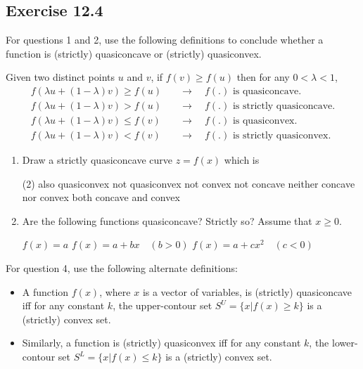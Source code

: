 \documentclass{./../../Latex/homework}
\begin{document}
\subsection*{Exercise 12.4}
For questions 1 and 2, use the following definitions to conclude whether a function is (strictly) quasiconcave or (strictly) quasiconvex. 

Given two distinct points $u$ and $v$, if $f(v) \geq f(u)$ then for any $0 <\lambda< 1 $, 
\begin{align*}
	f(\lambda u + (1-\lambda) v) \geq f(u) \quad & \rightarrow \quad f(.) \text{ is quasiconcave.} \\
	f(\lambda u + (1-\lambda) v) > f(u) \quad & \rightarrow \quad f(.) \text{ is strictly quasiconcave.} \\
	f(\lambda u + (1-\lambda) v) \leq f(v) \quad & \rightarrow \quad f(.) \text{ is quasiconvex.} \\
	f(\lambda u + (1-\lambda) v) < f(v) \quad & \rightarrow \quad f(.) \text{ is strictly quasiconvex.} 
\end{align*}

\begin{enumerate}

\item Draw a strictly quasiconcave curve $z=f(x)$ which is
\begin{tasks}(2)
\task also quasiconvex
\task not quasiconvex
\task not convex
\task not concave
\task neither concave nor convex
\task both concave and convex 	
\end{tasks}


\item Are the following functions quasiconcave? Strictly so? Assume that $x \geq 0$.
\begin{tasks}
\task $f(x)=a$
\task $f(x)=a+b x \quad (b>0)$
\task $f(x)=a+c x^{2} \quad (c<0)$
\end{tasks}
\end{enumerate}

For question 4, use the following alternate definitions: 
\begin{itemize}
  \item A function $f(x)$, where $x$ is a vector of variables, is (strictly) quasiconcave iff for any constant $k$, the upper-contour set
$ S^U = \{x | f(x) \geq k \} $ is a (strictly) convex set. 
\item Similarly, a function is (strictly) quasiconvex iff for any constant $k$, the lower-contour set $ S^L = \{x | f(x) \leq k \} $ is a (strictly) convex set.
\end{itemize}
\end{document}

